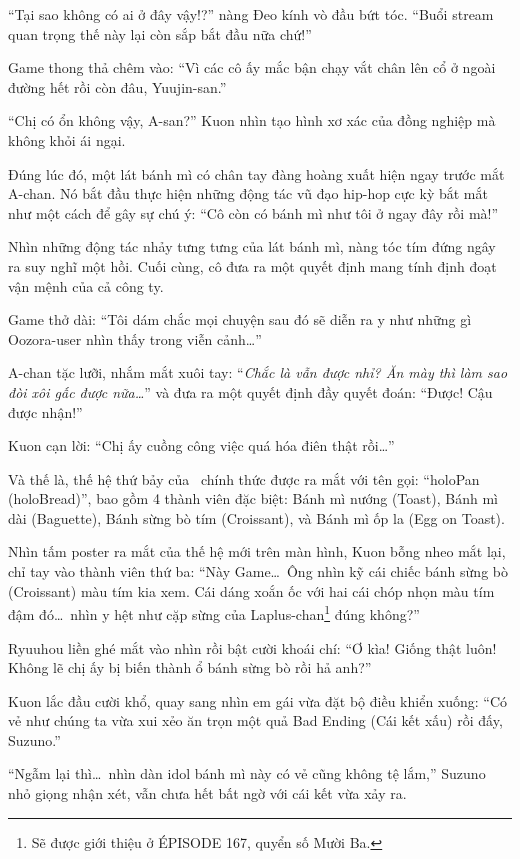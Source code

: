 \documentclass[../main.tex]{subfiles}
\begin{document}
``Tại sao không có ai ở đây vậy!?'' nàng Đeo kính vò đầu bứt tóc. ``Buổi stream quan trọng thế này lại còn sắp bắt đầu nữa chứ!''

Game thong thả chêm vào: ``Vì các cô ấy mắc bận chạy vắt chân lên cổ ở ngoài đường hết rồi còn đâu, Yuujin-san.''

``Chị có ổn không vậy, A-san?'' Kuon nhìn tạo hình xơ xác của đồng nghiệp mà không khỏi ái ngại.

Đúng lúc đó, một lát bánh mì có chân tay đàng hoàng xuất hiện ngay trước mắt A-chan. Nó bắt đầu thực hiện những động tác vũ đạo hip-hop cực kỳ bắt mắt như một cách để gây sự chú ý: ``Cô còn có bánh mì như tôi ở ngay đây rồi mà!''

Nhìn những động tác nhảy tưng tưng của lát bánh mì, nàng tóc tím đứng ngây ra suy nghĩ một hồi. Cuối cùng, cô đưa ra một quyết định mang tính định đoạt vận mệnh của cả công ty.

Game thở dài: ``Tôi dám chắc mọi chuyện sau đó sẽ diễn ra y như những gì Oozora-user nhìn thấy trong viễn cảnh\dots''

A-chan tặc lưỡi, nhắm mắt xuôi tay: ``\textit{Chắc là vẫn được nhỉ? Ăn mày thì làm sao đòi xôi gấc được nữa\dots}'' và đưa ra một quyết định đầy quyết đoán: ``Được! Cậu được nhận!''

Kuon cạn lời: ``Chị ấy cuồng công việc quá hóa điên thật rồi\dots''

Và thế là, thế hệ thứ bảy của \hll\ chính thức được ra mắt với tên gọi: ``holoPan (holoBread)'', bao gồm 4 thành viên đặc biệt: Bánh mì nướng (Toast), Bánh mì dài (Baguette), Bánh sừng bò tím (Croissant), và Bánh mì ốp la (Egg on Toast).


Nhìn tấm poster ra mắt của thế hệ mới trên màn hình, Kuon bỗng nheo mắt lại, chỉ tay vào thành viên thứ ba: ``Này Game\dots\ Ông nhìn kỹ cái chiếc bánh sừng bò (Croissant) màu tím kia xem. Cái dáng xoắn ốc với hai cái chóp nhọn màu tím đậm đó\dots\ nhìn y hệt như cặp sừng của Laplus-chan\footnote{Sẽ được giới thiệu ở {\flaregothic ÉPISODE 167}, quyển số Mười Ba.} đúng không?''

Ryuuhou liền ghé mắt vào nhìn rồi bật cười khoái chí: ``Ơ kìa! Giống thật luôn! Không lẽ chị ấy bị biến thành ổ bánh sừng bò rồi hả anh?''

Kuon lắc đầu cười khổ, quay sang nhìn em gái vừa đặt bộ điều khiển xuống: ``Có vẻ như chúng ta vừa xui xẻo ăn trọn một quả Bad Ending (Cái kết xấu) rồi đấy, Suzuno.''

``Ngẫm lại thì\dots\ nhìn dàn idol bánh mì này có vẻ cũng không tệ lắm,'' Suzuno nhỏ giọng nhận xét, vẫn chưa hết bất ngờ với cái kết vừa xảy ra.
\end{document}

